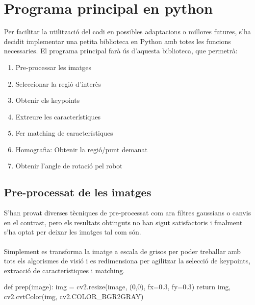 \section{Programa principal en python}
	Per facilitar la utilització del codi en possibles adaptacions o millores futures, s'ha decidit implementar una petita biblioteca en Python amb totes les funcions necessaries. El programa principal farà ús
	d'aquesta biblioteca, que permetrà:

	\begin{enumerate}
		\item{Pre-processar les imatges}
		\item{Seleccionar la regió d'interès}
		\item{Obtenir els keypoints}
		\item{Extreure les característiques}
		\item{Fer matching de característiques}
		\item{Homografia: Obtenir la regió/punt demanat}
		\item{Obtenir l'angle de rotació pel robot}
	\end{enumerate}

	\subsection{Pre-processat de les imatges}
		S'han provat diverses tècniques de pre-processat com ara filtres gaussians o canvis en el contrast, pero els resultats obtinguts no han sigut satisfactoris i finalment s'ha optat per deixar
		les imatges tal com són.\\\\
		Simplement es transforma la imatge a escala de grisos per poder treballar amb tots els algorismes de visió i es redimensiona per agilitzar la selecció de keypoints, extracció
		de característiques i matching.\\
		\begin{python}
def prep(image):
	img = cv2.resize(image, (0,0), fx=0.3, fy=0.3)
	return img, cv2.cvtColor(img, cv2.COLOR_BGR2GRAY)
		\end{python}
